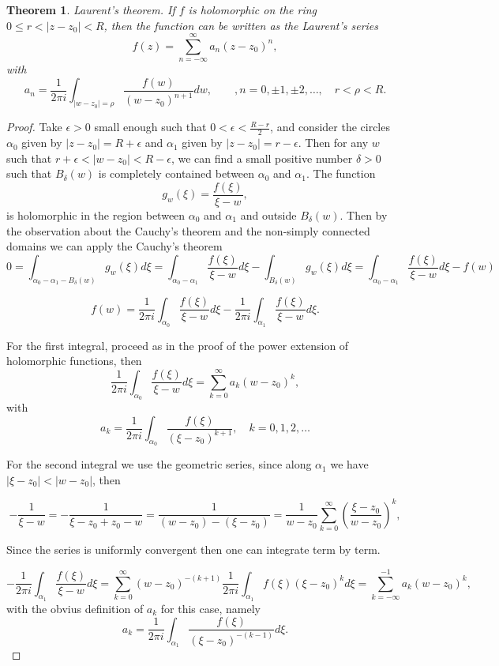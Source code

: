 \documentclass{amsart}
\newtheorem{thm}{Theorem}
\begin{document}
\begin{thm}
\alert{Laurent's theorem}. If \(f\) is holomorphic on the ring \(0 \leq r < |z - z_0| < R\), then the function can be written as the Laurent's series
\[ f(z) = \sum_{n = -\infty}^{\infty} a_n (z - z_0) ^n ,\]
with
\[ a_n = \frac{1}{2\pi i} \int_{|w - z_0| = \rho}\frac{f(w)}{(w - z_0)^{n+1}} dw, \qquad, n = 0, \pm 1, \pm 2, \ldots, \quad r < \rho < R. \]
\end{thm}
\begin{proof}
Take \(\epsilon >0\) small enough such that \(0 < \epsilon < \frac{R - r}{2}\), and consider the circles \(\alpha_0\) given by \(|z-z_0| = R + \epsilon\) and  \(\alpha_1\) given by \(|z-z_0| = r - \epsilon\).
Then for any \(w\) such that \(r + \epsilon < |w - z_0 | < R-\epsilon\), we can find a small positive number \(\delta >0\) such that \(B_\delta(w)\) is completely contained between \(\alpha_0\) and \(\alpha_1\). The function 
\[ g_w(\xi) = \frac{f(\xi)}{\xi - w}, \]
is holomorphic in the region between \(\alpha_0\) and \(\alpha_1\) and outside \(B_\delta(w)\). Then by the observation about the Cauchy's theorem and the non-simply connected domains
 we can apply the Cauchy's theorem
\[ 0 = \int_{\alpha_0  - \alpha_1- B_{\delta}(w)} g_w(\xi)d\xi = \int_{\alpha_0  - \alpha_1} \frac{f(\xi)}{\xi - w} d\xi - \int_{B_{\delta}(w)} g_w(\xi)d\xi = \int_{\alpha_0  - \alpha_1} \frac{f(\xi)}{\xi - w} d\xi - f(w) \] 

\[ f(w) = \frac{1}{2\pi i} \int_{\alpha_0} \frac{f(\xi)}{\xi - w} d\xi - \frac{1}{2\pi i} \int_{\alpha_1} \frac{f(\xi)}{\xi - w} d\xi .\]

For the first integral, proceed as in the proof of the power extension of holomorphic functions, then
\[ \frac{1}{2\pi i} \int_{\alpha_0} \frac{f(\xi)}{\xi - w} d\xi = \sum_{k=0}^{\infty} a_k (w - z_0)^k, \]
with 
\[ a_k = \frac{1}{2\pi i } \int_{\alpha_0}\frac{f(\xi)}{(\xi - z_0)^{k+1}}, \quad k = 0,1,2,\ldots \]

For the second integral we use the geometric series, since along \(\alpha_1\) we have \(|\xi - z_0| < |w - z_0|\), then

\[ - \frac{1}{\xi - w} = - \frac{1}{\xi - z_0 + z_0 - w} =   \frac{1}{(w - z_0) - ( \xi - z_0 )} = \frac{1}{w - z_0} \sum_{k=0}^{\infty}\left( \frac{\xi - z_0}{w-z_0}\right)^k,\]

Since the series is uniformly convergent then one can integrate term by term. 

\[ - \frac{1}{2\pi i } \int_{\alpha_1}\frac{f(\xi)}{\xi - w}d\xi = \sum_{k=0}^{\infty} (w-z_0)^{-(k+1)} \frac{1}{2\pi i} \int_{\alpha_1} f(\xi) (\xi - z_0)^{k} d\xi = \sum_{k = -\infty}^{-1} a_k (w - z_0)^{k}, \]
with the obvius definition of \(a_{k}\) for this case, namely
\[ a_{k} = \frac{1}{2\pi i } \int_{\alpha_1}\frac{f(\xi)}{(\xi - z_0)^{-(k-1)}}d\xi . \]
\end{proof}
\end{document}
